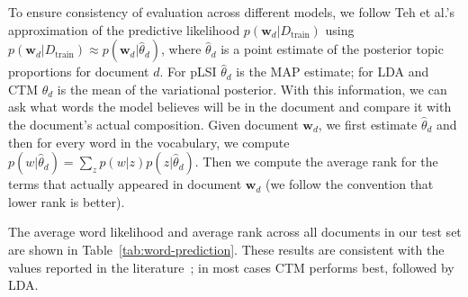 To ensure consistency of evaluation across different models, we follow
Teh et al.'s~\cite{TehKurWel2008} approximation of the predictive
likelihood $p(\textbf{w}_d|D_{\textrm{train}})$ using $p({\bm
  w}_d|D_{\textrm{train}}) \approx p({\bm w}_d|\hat{\theta}_d)$, where
$\hat{\theta}_d$ is a point estimate of the posterior topic
proportions for document $d$. For pLSI $\hat{\theta}_d$ is the MAP
estimate; for LDA and CTM $\hat{\theta}_d$ is the mean of the
variational posterior.
With this information, we can ask what words the model believes will
be in the document and compare it with the document's actual
composition.  Given document $\bm w_d$, we first estimate
$\hat{\theta}_d$ and then for every word in the vocabulary, we compute
$p(w|\hat{\theta}_d) = \sum_z p(w|z)p(z|\hat{\theta}_d)$.  Then we
compute the average rank for the terms that actually appeared in document
$\bm w_d$ (we follow the convention that lower rank is better).

The average word likelihood and average rank across all documents in
our test set are shown in Table~\ref{tab:word-prediction}.  These
results are consistent with the values reported in the
literature~\cite{blei-03,blei-06}; in most cases CTM performs best,
followed by LDA.

